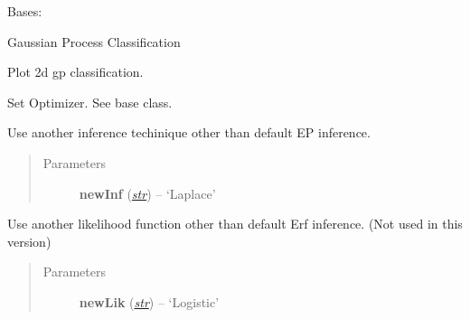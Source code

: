 \documentclass[letterpaper,10pt,english]{sphinxmanual}
\begin{document}
\begin{fulllineitems}
\label{pyGPs.Core:pyGPs.Core.gp.GPC}
Bases: {\hyperref[pyGPs.Core:pyGPs.Core.gp.GP]{}}

Gaussian Process Classification

\begin{fulllineitems}
\label{pyGPs.Core:pyGPs.Core.gp.GPC.plot}
Plot 2d gp classification.

\end{fulllineitems}


\begin{fulllineitems}
\label{pyGPs.Core:pyGPs.Core.gp.GPC.setOptimizer}
Set Optimizer. See base class.

\end{fulllineitems}


\begin{fulllineitems}
\label{pyGPs.Core:pyGPs.Core.gp.GPC.useInference}
Use another inference techinique other than default EP inference.
\begin{quote}\begin{description}
\item[{Parameters}] \leavevmode
\textbf{newInf} (\href{http://docs.python.org/library/functions.html\#str}{\emph{str}}) -- `Laplace'

\end{description}\end{quote}

\end{fulllineitems}


\begin{fulllineitems}
\label{pyGPs.Core:pyGPs.Core.gp.GPC.useLikelihood}
Use another likelihood function other than default Erf inference.
(Not used in this version)
\begin{quote}\begin{description}
\item[{Parameters}] \leavevmode
\textbf{newLik} (\href{http://docs.python.org/library/functions.html\#str}{\emph{str}}) -- `Logistic'

\end{description}\end{quote}

\end{fulllineitems}


\end{fulllineitems}
\end{document}

